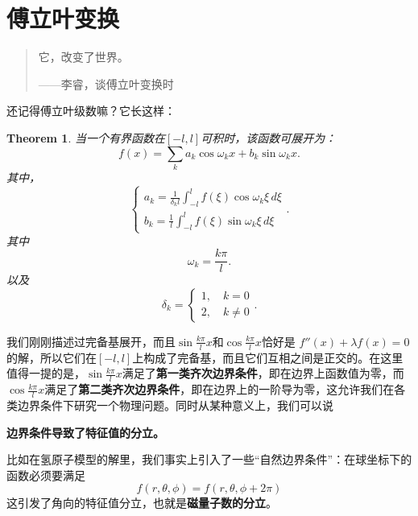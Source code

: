 \documentclass[12pt,a4paper,openany,twoside]{book}
\newtheorem{theorem}{Theorem}[section]
\numberwithin{equation}{section}
\begin{document}
    \section{傅立叶变换}
  \begin{quote}
    它，改变了世界。
    \begin{flushright}
      ——李睿，谈傅立叶变换时
    \end{flushright}
  \end{quote}     
  还记得傅立叶级数嘛？它长这样：
  \begin{theorem}
  当一个有界函数在$[-l,l]$可积时，该函数可展开为：
  \begin{equation}
    f(x) = \sum_k a_k \cos{\omega_k x} + b_k \sin{\omega_k x}.
  \end{equation}
  其中，
  \begin{equation} 
\begin{cases}
  a_k = \frac{1}{\delta_k l}\int _{-l} ^l f(\xi) \cos{\omega_k} \xi \, d\xi \\
  b_k =  \frac{1}{l} \int _{-l} ^l f(\xi) \sin{\omega_k \xi} \, d\xi 
\end{cases}
.
\end{equation}
其中
\begin{equation}
\omega_k = \frac{k \pi}{l}.
\end{equation}
以及
\begin{equation}
  \delta_k =
  \begin{cases}
  1, \quad k = 0 \\
  2, \quad k \neq 0 
  \end{cases}
  .
\end{equation}
 \end{theorem}

我们刚刚描述过完备基展开，而且$\sin{\frac{k \pi}{l} x}$和$\cos{\frac{k \pi}{l} x}$恰好是 $f''(x) + \lambda f(x) = 0$的解，所以它们在$[-l,l]$上构成了完备基，而且它们互相之间是正交的。在这里值得一提的是，$\sin{\frac{k \pi}{l} x}$满足了\textbf{第一类齐次边界条件}，即在边界上函数值为零，而$\cos{\frac{k \pi}{l} x}$满足了\textbf{第二类齐次边界条件}，即在边界上的一阶导为零，这允许我们在各类边界条件下研究一个物理问题。同时从某种意义上，我们可以说
\begin{center}
\textbf{边界条件导致了特征值的分立。}
\end{center}
比如在氢原子模型的解里，我们事实上引入了一些“自然边界条件”：在球坐标下的函数必须要满足
\begin{equation}
f(r,\theta, \phi) = f(r,\theta, \phi + 2\pi)
\end{equation}
这引发了角向的特征值分立，也就是\textbf{磁量子数的分立}。
\end{document}

